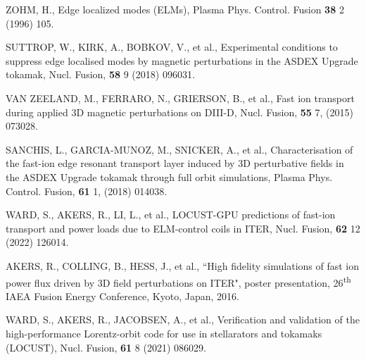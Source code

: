 \documentclass[10pt, a4paper, twoside]{article}
\begin{document}
\begin{thebibliography}{9}
    ZOHM, H., 
    Edge localized modes (ELMs), 
    Plasma Phys. Control. Fusion 
    \textbf{38} 2 
    (1996) 
    105.

    SUTTROP, W., KIRK, A., BOBKOV, V., et al.,
    Experimental conditions to suppress edge localised modes by magnetic perturbations in the ASDEX Upgrade tokamak,
    Nucl. Fusion,
    \textbf{58} 9 
    (2018) 
    096031.
    
    VAN ZEELAND, M., FERRARO, N., GRIERSON, B., et al.,
    Fast ion transport during applied 3D magnetic perturbations on DIII-D,
    Nucl. Fusion,
    \textbf{55} 7,
    (2015)
    073028.

    SANCHIS, L., GARCIA-MUNOZ, M., SNICKER, A., et al.,
    Characterisation of the fast-ion edge resonant transport layer induced by 3D perturbative fields in the ASDEX Upgrade tokamak through full orbit simulations,
    Plasma Phys. Control. Fusion,
    \textbf{61} 1,
    (2018)
    014038.
    
    WARD, S., AKERS, R., LI, L., et al.,
    LOCUST-GPU predictions of fast-ion transport and power loads due to ELM-control coils in ITER,
    Nucl. Fusion,
    \textbf{62} 12
    (2022)
    126014.

    AKERS, R., COLLING, B., HESS, J., et al.,
    ``High fidelity simulations of fast ion power flux driven by 3D field perturbations on ITER",
    poster presentation, 
    26\textsuperscript{th} IAEA Fusion Energy Conference,
    Kyoto, Japan, 
    2016.

    WARD, S., AKERS, R., JACOBSEN, A., et al.,
    Verification and validation of the high-performance Lorentz-orbit code for use in stellarators and tokamaks (LOCUST),
    Nucl. Fusion,
    \textbf{61} 8
    (2021)
    086029.


\end{thebibliography}
\end{document}
